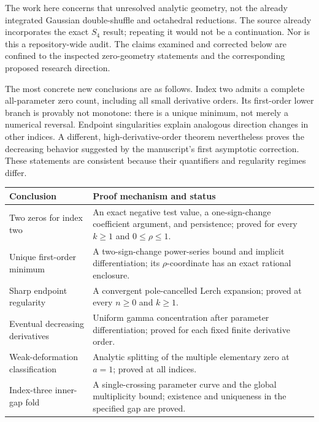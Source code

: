 \documentclass[11pt,letterpaper]{article}
\numberwithin{equation}{section}
\theoremstyle{definition}\newtheorem{definition}[theorem]{Definition}
\theoremstyle{remark}\newtheorem{remark}[theorem]{Remark}
\begin{document}
The work here concerns that unresolved analytic geometry, not the already integrated Gaussian double-shuffle and octahedral reductions. The source already incorporates the exact $S_4$ result; repeating it would not be a continuation. Nor is this a repository-wide audit. The claims examined and corrected below are confined to the inspected zero-geometry statements and the corresponding proposed research direction.

The most concrete new conclusions are as follows. Index two admits a complete all-parameter zero count, including all small derivative orders. Its first-order lower branch is provably not monotone: there is a unique minimum, not merely a numerical reversal. Endpoint singularities explain analogous direction changes in other indices. A different, high-derivative-order theorem nevertheless proves the decreasing behavior suggested by the manuscript's first asymptotic correction. These statements are consistent because their quantifiers and regularity regimes differ.

\begin{center}\small
\begin{tabularx}{\linewidth}{@{}p{.26\linewidth}X@{}}
\toprule
Conclusion & Proof mechanism and status\\\midrule
Two zeros for index two & An exact negative test value, a one-sign-change coefficient argument, and persistence; proved for every $k\ge1$ and $0\le\rho\le1$.\\
Unique first-order minimum & A two-sign-change power-series bound and implicit differentiation; its $\rho$-coordinate has an exact rational enclosure.\\
Sharp endpoint regularity & A convergent pole-cancelled Lerch expansion; proved at every $n\ge0$ and $k\ge1$.\\
Eventual decreasing derivatives & Uniform gamma concentration after parameter differentiation; proved for each fixed finite derivative order.\\
Weak-deformation classification & Analytic splitting of the multiple elementary zero at $a=1$; proved at all indices.\\
Index-three inner-gap fold & A single-crossing parameter curve and the global multiplicity bound; existence and uniqueness in the specified gap are proved.\\\bottomrule
\end{tabularx}
\end{center}
\end{document}
